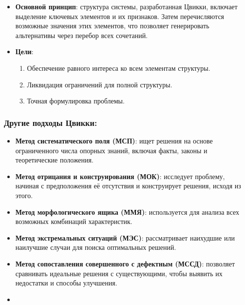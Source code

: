 \documentclass[
]{article}
\providecommand{\tightlist}{%
  \setlength{\itemsep}{0pt}\setlength{\parskip}{0pt}}
\begin{document}
\begin{itemize}
\tightlist
\item
  \textbf{Основной принцип}: структура системы, разработанная Цвикки,
  включает выделение ключевых элементов и их признаков. Затем
  перечисляются возможные значения этих элементов, что позволяет
  генерировать альтернативы через перебор всех сочетаний.
\item
  \textbf{Цели}:

  \begin{enumerate}
  \def\labelenumi{\arabic{enumi}.}
  \tightlist
  \item
    Обеспечение равного интереса ко всем элементам структуры.
  \item
    Ликвидация ограничений для полной структуры.
  \item
    Точная формулировка проблемы.
  \end{enumerate}
\end{itemize}

\subsubsection{\texorpdfstring{\textbf{Другие подходы
Цвикки}:}{Другие подходы Цвикки:}}\label{ux434ux440ux443ux433ux438ux435-ux43fux43eux434ux445ux43eux434ux44b-ux446ux432ux438ux43aux43aux438}

\begin{itemize}
\tightlist
\item
  \textbf{Метод систематического поля (МСП)}: ищет решения на основе
  ограниченного числа опорных знаний, включая факты, законы и
  теоретические положения.
\item
  \textbf{Метод отрицания и конструирования (МОК)}: исследует проблему,
  начиная с предположения её отсутствия и конструирует решения, исходя
  из этого.
\item
  \textbf{Метод морфологического ящика (ММЯ)}: используется для анализа
  всех возможных комбинаций характеристик.
\item
  \textbf{Метод экстремальных ситуаций (МЭС)}: рассматривает наихудшие
  или наилучшие случаи для поиска оптимальных решений.
\item
  \textbf{Метод сопоставления совершенного с дефектным (МССД)}:
  позволяет сравнивать идеальные решения с существующими, чтобы выявить
  их недостатки и способы улучшения.
\item
\end{itemize}
\end{document}
